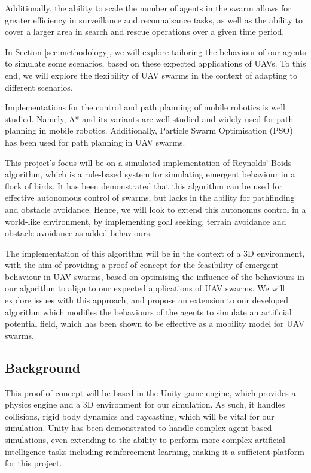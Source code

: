 \documentclass[12pt]{article}
\begin{document}
Additionally, the ability to scale the number of agents in the swarm allows for greater efficiency in surveillance and reconnaisance tasks, as well as the ability to cover a larger area in search and rescue operations over a given time period.

In Section \ref{sec:methodology}, we will explore tailoring the behaviour of our agents to simulate some scenarios, based on these expected applications of UAVs. To this end, we will explore the flexibility of UAV swarms in the context of adapting to different scenarios.

Implementations for the control and path planning of mobile robotics is well studied. Namely, A* and its variants are well studied and widely used for path planning in mobile robotics\cite{Chen}. Additionally, Particle Swarm Optimisation (PSO) has been used for path planning in UAV swarms\cite{Pyke}.

This project's focus will be on a simulated implementation of Reynolds' Boids\cite{Reynolds} algorithm, which is a rule-based system for simulating emergent behaviour in a flock of birds. It has been demonstrated that this algorithm can be used for effective autonomous control of swarms\cite{Basu}, but lacks in the ability for pathfinding and obstacle avoidance\cite{Pyke}. Hence, we will look to extend this autonomus control in a world-like environment, by implementing goal seeking, terrain avoidance and obstacle avoidance as added behaviours.

The implementation of this algorithm will be in the context of a 3D environment, with the aim of providing a proof of concept for the feasibility of emergent behaviour in UAV swarms, based on optimising the influence of the behaviours in our algorithm to align to our expected applications of UAV swarms. We will explore issues with this approach, and propose an extension to our developed algorithm which modifies the behaviours of the agents to simulate an artificial potential field, which has been shown to be effective as a mobility model for UAV swarms\cite{Falomir}.

\subsection{Background}

This proof of concept will be based in the Unity game engine, which provides a physics engine and a 3D environment for our simulation. As such, it handles collisions, rigid body dynamics and raycasting, which will be vital for our simulation. Unity has been demonstrated to handle complex agent-based simulations, even extending to the ability to perform more complex artificial intelligence tasks including reinforcement learning\cite{juliani2020unity}, making it a sufficient platform for this project.
\end{document}
